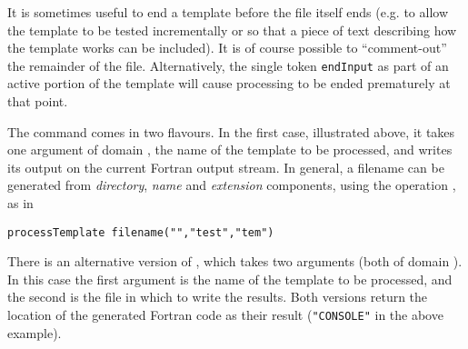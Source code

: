 It is sometimes useful to end a template before the file itself ends (e.g. to
allow the template to be tested incrementally or so that a piece of text
describing how the template works can be included).  It is of course possible
to ``comment-out'' the remainder of the file.  Alternatively, the single token
{\tt endInput} as part of an active portion of the template will cause
processing to be ended prematurely at that point.

The  command comes in two flavours.  In the first case,
illustrated above, it takes one argument of domain ,
the name of the template to be processed, and writes its output on the
current Fortran output stream.  In general, a filename can be generated
from {\em directory}, {\em name} and {\em extension} components, using
the operation , as in
\begin{verbatim}
processTemplate filename("","test","tem")
\end{verbatim}
There is an alternative version of , which
takes two arguments (both of domain ).  In this case the
first argument is the name of the template to be processed, and the
second is the file in which to write the results.  Both versions return
the location of the generated Fortran code as their result
({\tt "CONSOLE"} in the above example).

